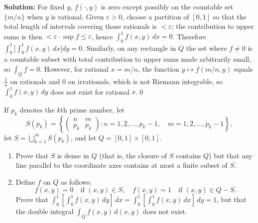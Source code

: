 \bigskip\noindent\textbf{Solution:}
For fixed $y$, $f(\cdot,y)$ is zero except possibly on the countable set $\{m/n\}$ when $y$ is rational. Given $\varepsilon>0$, choose a partition of $[0,1]$ so that the total length of intervals covering those rationals is $<\varepsilon$; the contribution to upper sums is then $<\varepsilon\cdot\sup f\le \varepsilon$, hence $\int_0^1 f(x,y)\,dx=0$. Therefore $\int_0^1\!\Big[\int_0^1 f(x,y)\,dx\Big]dy=0$.
Similarly, on any rectangle in $Q$ the set where $f\ne 0$ is a countable subset with total contribution to upper sums made arbitrarily small, so $\int_Q f=0$. However, for rational $x=m/n$, the function $y\mapsto f(m/n,y)$ equals $\tfrac{1}{n}$ on rationals and $0$ on irrationals, which is not Riemann integrable, so $\int_0^1 f(x,y)\,dy$ does not exist for rational $x$.\qed


\begin{problembox}
If \( p_k \) denotes the \( k \)th prime number, let
\[S(p_k) = \left\{ \begin{pmatrix}
n & m \\
p_k & p_k
\end{pmatrix} : n = 1, 2, \ldots, p_k - 1, \quad m = 1, 2, \ldots, p_k - 1 \right\},\]
let \( S = \bigcup_{k=1}^{\infty} S(p_k) \), and let \( Q = [0, 1] \times [0, 1] \).

\begin{enumerate}[label=(\alph*)]
    \item Prove that \( S \) is dense in \( Q \) (that is, the closure of \( S \) contains \( Q \)) but that any line parallel to the coordinate axes contains at most a finite subset of \( S \).
    
    \item Define \( f \) on \( Q \) as follows:
    \[f(x, y) = 0 \quad \text{if } (x, y) \in S, \quad f(x, y) = 1 \quad \text{if } (x, y) \in Q - S.\]
    Prove that \( \int_{0}^{1} \left[ \int_{0}^{1} f(x, y) \, dy \right] \, dx = \int_{0}^{1} \left[ \int_{0}^{1} f(x, y) \, dx \right] \, dy = 1 \), but that the double integral \( \int_{Q} f(x, y) \, d(x, y) \) does not exist.
\end{enumerate}
\end{problembox}

